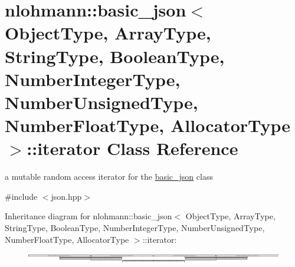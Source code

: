 \hypertarget{classnlohmann_1_1basic__json_1_1iterator}{\section{nlohmann\-:\-:basic\-\_\-json$<$ Object\-Type, Array\-Type, String\-Type, Boolean\-Type, Number\-Integer\-Type, Number\-Unsigned\-Type, Number\-Float\-Type, Allocator\-Type $>$\-:\-:iterator Class Reference}
\label{classnlohmann_1_1basic__json_1_1iterator}
}


a mutable random access iterator for the \hyperlink{classnlohmann_1_1basic__json}{basic\-\_\-json} class  




{\ttfamily \#include $<$json.\-hpp$>$}

Inheritance diagram for nlohmann\-:\-:basic\-\_\-json$<$ Object\-Type, Array\-Type, String\-Type, Boolean\-Type, Number\-Integer\-Type, Number\-Unsigned\-Type, Number\-Float\-Type, Allocator\-Type $>$\-:\-:iterator\-:\begin{figure}[H]
\begin{center}
\leavevmode
\includegraphics[height=0.426396cm]{classnlohmann_1_1basic__json_1_1iterator}
\end{center}
\end{figure}
